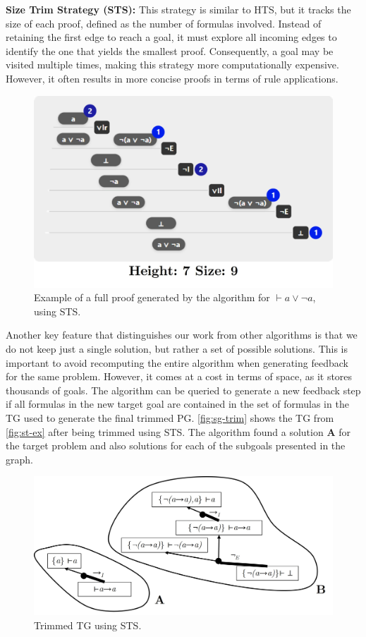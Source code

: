 \textbf{Size Trim Strategy (STS):} This strategy is similar to HTS, but it tracks the size of each proof, defined as the number of formulas involved. Instead of retaining the first edge to reach a goal, it must explore all incoming edges to identify the one that yields the smallest proof. Consequently, a goal may be visited multiple times, making this strategy more computationally expensive. However, it often results in more concise proofs in terms of rule applications.

\begin{figure}[t]
    \centering
    \includegraphics[width=0.6\linewidth]{resources/trim-size.jpg}
    \caption{Example of a full proof generated by the algorithm for \(\vdash a \vee \lnot a\), using STS.}
    \label{fig:sg-trim-size}
\end{figure}

Another key feature that distinguishes our work from other algorithms is that we do not keep just a single solution, but rather a set of possible solutions. This is important to avoid recomputing the entire algorithm when generating feedback for the same problem. However, it comes at a cost in terms of space, as it stores thousands of goals. The algorithm can be queried to generate a new feedback step if all formulas in the new target goal are contained in the set of formulas in the TG used to generate the final trimmed PG. \autoref{fig:sg-trim} shows the TG from \autoref{fig:st-ex} after being trimmed using STS. The algorithm found a solution \textbf{A} for the target problem and also solutions for each of the subgoals presented in the graph.
\begin{figure}[t]
    \centering
    \includegraphics[width=0.8\linewidth]{resources/sg-final.jpg}
    \caption{Trimmed TG using STS.}
    \label{fig:sg-trim}
\end{figure}
